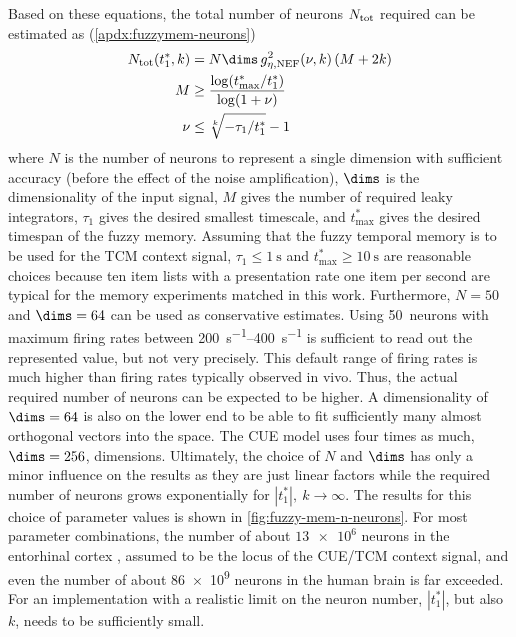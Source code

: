 Based on these equations, the total number of neurons $N_{{\mathrm{tot}}}$ required can be estimated as (\cref{apdx:fuzzymem-neurons})
\begin{align}
    N_{\ped{tot}}(t^*_1, k) &= N \dims\, g_{\eta,\ped{NEF}}^2(\nu, k) \del{M + 2k} \label{eqn:fuzzy-n-neurons}\\
    M &\geq \frac{\log(t^*_{\max} / t^*_1)}{\log(1 + \nu)} \\
    \nu &\leq \sqrt[k]{-\tau_1 / t^*_1} - 1
\end{align}
where $N$ is the number of neurons to represent a single dimension with sufficient accuracy (before the effect of the noise amplification), $\dims$ is the dimensionality of the input signal, $M$ gives the number of required leaky integrators, $\tau_1$ gives the desired smallest timescale, and $t^*_{\max}$ gives the desired timespan of the fuzzy memory.
Assuming that the fuzzy temporal memory is to be used for the TCM context signal, $\tau_1 \leq \SI{1}{\second}$ and $t^*_{\max} \geq \SI{10}{\second}$ are reasonable choices because ten item lists with a presentation rate one item per second are typical for the memory experiments matched in this work.
Furthermore, $N = 50$ and $\dims = 64$ can be used as conservative estimates.
Using \num{50}~neurons with maximum firing rates between \SIrange{200}{400}{\second^{-1}} is sufficient to read out the represented value, but not very precisely.
This default range of firing rates is much higher than firing rates typically observed in vivo.
Thus, the actual required number of neurons can be expected to be higher.
A dimensionality of $\dims = 64$ is also on the lower end to be able to fit sufficiently many almost orthogonal vectors into the space.
The CUE model uses four times as much, $\dims = 256$, dimensions.
Ultimately, the choice of $N$ and $\dims$ has only a minor influence on the results as they are just linear factors while the required number of neurons grows exponentially for $|t^*_1|,\ k \rightarrow \infty$.
The results for this choice of parameter values is shown in \cref{fig:fuzzy-mem-n-neurons}.
For most parameter combinations, the number of about $\num{13e6}$ neurons in the entorhinal cortex \parencite{west1998}, assumed to be the locus of the CUE/TCM context signal, and even the number of about \num{86e9} neurons in the human brain \parencite{azevedo2009} is far exceeded.
For an implementation with a realistic limit on the neuron number, $|t^*_1|$, but also $k$, needs to be sufficiently small.
